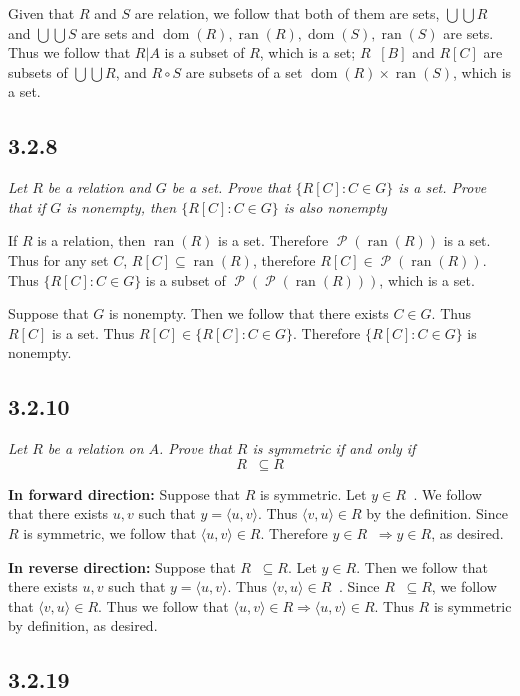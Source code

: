 \documentclass[11pt,oneside,titlepage]{book}
\DeclareMathOperator \pow {\mathcal {P}}
\DeclareMathOperator \inv {^{-1}}
\DeclareMathOperator \ra {\Rightarrow}
\DeclareMathOperator \dom {dom}
\DeclareMathOperator \ran {ran}
\newcommand{\eangle}[1]{\langle #1 \rangle}
\begin{document}
Given that $R$ and $S$ are relation, we follow that both of them are sets,
$\bigcup \bigcup R$ and  $\bigcup \bigcup S$ are sets and $\dom (R), \ran(R), \dom(S), \ran(S)$
are sets. Thus we follow that $R|A$ is a subset of
$R$, which is a set; $R\inv [B]$  and $R[C]$ are subsets of $\bigcup \bigcup R$,
and $R \circ S$ are subsets of a set $\dom (R) \times \ran(S)$, which is a set.


\subsection*{3.2.8}

\textit{Let $R$ be a relation and $G$ be a set. Prove that $\{R[C]: C \in G\}$ is a set. Prove
  that if $G$ is nonempty, then $\{R[C]: C \in G\}$ is also nonempty}

If $R$ is a relation, then $\ran(R)$ is a set. Therefore $\pow(\ran(R))$ is a set. Thus
for any set $C$, $R[C] \subseteq \ran(R)$, therefore $R[C] \in \pow(\ran(R))$. Thus
$\{R[C]: C \in G\}$ is a subset of $\pow(\pow(\ran(R)))$, which is a set.

Suppose that $G$ is nonempty. Then we follow that there exists $C \in G$. Thus
$R[C]$ is a set. Thus $R[C] \in \{R[C]: C \in G\}$. Therefore $\{R[C]: C \in G\}$ is
nonempty.

\subsection*{3.2.10}

\textit{Let $R$ be a relation on $A$. Prove that $R$ is symmetric if and only if
  $$R\inv \subseteq R$$}

\textbf{In forward direction: }
Suppose that $R$ is symmetric. 
Let $y \in R \inv$. We follow that there exists $u, v$ such that $y = \eangle{u, v}$.
Thus $\eangle{v, u} \in R$ by the definition. Since $R$ is symmetric, we follow that
$\eangle{u, v} \in R$. Therefore $y \in R\inv \ra y \in R$, as desired.

\textbf{In reverse direction: }
Suppose that $R\inv \subseteq R$. Let $y \in R$. Then we follow that there exists
$u, v$ such that $y = \eangle{u, v}$. Thus $\eangle{v, u} \in R\inv$. Since $R\inv \subseteq R$,
we follow that $\eangle{v, u} \in R$. Thus we follow that $\eangle{u, v} \in R \ra
\eangle{u, v} \in R$. Thus $R$ is symmetric by definition, as desired.

\subsection*{3.2.19}
\end{document}
